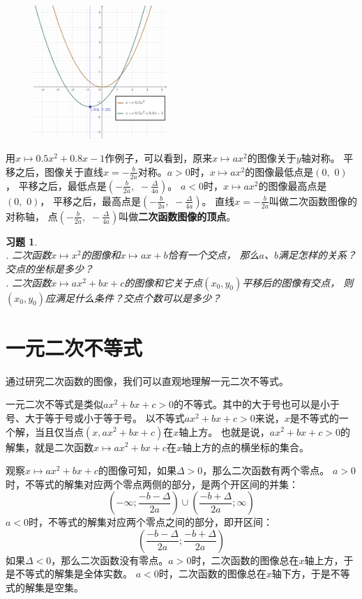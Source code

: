 \documentclass[12pt,UTF8]{ctexbook}
\newtheorem{xt}{习题}[section]
\begin{document}
\begin{figure}[ht] %
    \centering
    \includegraphics[width=0.45\textwidth]{tu/二次函数3.png}
\end{figure}

用$x\mapsto 0.5x^2+0.8x-1$作例子，可以看到，原来$x\mapsto ax^2$的图像关于$y$轴对称。
平移之后，图像关于直线$x = -\frac{b}{2a}$对称。$a>0$时，$x\mapsto ax^2$的图像最低点是$(0,\,\,0)$，
平移之后，最低点是$\left(-\frac{b}{2a}, \,\,-\frac{\Delta}{4a}\right)$。
$a<0$时，$x\mapsto ax^2$的图像最高点是$(0,\,\,0)$，
平移之后，最高点是$\left(-\frac{b}{2a}, \,\,-\frac{\Delta}{4a}\right)$。
直线$x = -\frac{b}{2a}$叫做二次函数图像的对称轴，
点$\left(-\frac{b}{2a}, \,\,-\frac{\Delta}{4a}\right)$叫做\textbf{二次函数图像的顶点}。
\begin{xt}\label{xt:5-1-0}
    \mbox{} \\    
    . 二次函数$x\mapsto x^2$的图像和$x\mapsto ax + b$恰有一个交点，
    那么$a$、$b$满足怎样的关系？交点的坐标是多少？\\
    . 二次函数$x\mapsto ax^2+bx+c$的图像和它关于点$(x_0, y_0)$平移后的图像有交点，
    则$(x_0, y_0)$应满足什么条件？交点个数可以是多少？
\end{xt}

\section{一元二次不等式}
通过研究二次函数的图像，我们可以直观地理解一元二次不等式。

一元二次不等式是类似$ax^2 + bx + c > 0$的不等式。其中的大于号也可以是小于号、大于等于号或小于等于号。
以不等式$ax^2 + bx + c > 0$来说，$x$是不等式的一个解，当且仅当点$(x, ax^2 + bx + c)$在$x$轴上方。
也就是说，$ax^2 + bx + c > 0$的解集，就是二次函数$ x \mapsto ax^2 + bx + c$在$x$轴上方的点的横坐标的集合。

观察$x \mapsto ax^2 + bx + c$的图像可知，如果$\Delta>0$，那么二次函数有两个零点。
$a>0$时，不等式的解集对应两个零点两侧的部分，是两个开区间的并集：
$$ (-\infty; \frac{-b - \Delta}{2a}) \cup (\frac{-b +\Delta}{2a}; \infty)$$
$a<0$时，不等式的解集对应两个零点之间的部分，即开区间：
$$ (\frac{-b - \Delta}{2a}; \frac{-b +\Delta}{2a}) $$
如果$\Delta<0$，那么二次函数没有零点。$a>0$时，二次函数的图像总在$x$轴上方，于是不等式的解集是全体实数。
$a<0$时，二次函数的图像总在$x$轴下方，于是不等式的解集是空集。
\end{document}
